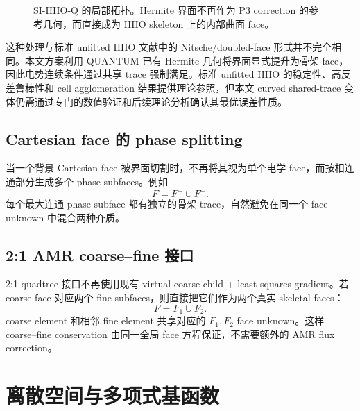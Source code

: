 \documentclass[UTF8,a4paper,11pt]{ctexart}
\begin{document}
\begin{figure}[htbp]
\centering
{}
\caption{SI-HHO-Q 的局部拓扑。Hermite 界面不再作为 P3 correction 的参考几何，而直接成为 HHO skeleton 上的内部曲面 face。}
\label{fig:cut_cell_topology}
\end{figure}

这种处理与标准 unfitted HHO 文献中的 Nitsche/doubled-face 形式并不完全相同。本文方案利用 QUANTUM 已有 Hermite 几何将界面显式提升为骨架 face，因此电势连续条件通过共享 trace 强制满足。标准 unfitted HHO 的稳定性、高反差鲁棒性和 cell agglomeration 结果提供理论参照\cite{BurmanErn2018,BurmanCicuttinDelayErn2021}，但本文 curved shared-trace 变体仍需通过专门的数值验证和后续理论分析确认其最优误差性质。

\subsection{Cartesian face 的 phase splitting}

当一个背景 Cartesian face 被界面切割时，不再将其视为单个电学 face，而按相连通部分生成多个 phase subfaces。例如
\[
F=F^-\cup F^+.
\]
每个最大连通 phase subface 都有独立的骨架 trace，自然避免在同一个 face unknown 中混合两种介质。

\subsection{2:1 AMR coarse--fine 接口}

2:1 quadtree 接口不再使用现有 virtual coarse child + least-squares gradient。若 coarse face 对应两个 fine subfaces，则直接把它们作为两个真实 skeletal faces：
\[
F=F_1\cup F_2.
\]
coarse element 和相邻 fine element 共享对应的 \(F_1,F_2\) face unknown。这样 coarse--fine conservation 由同一全局 face 方程保证，不需要额外的 AMR flux correction。

\section{离散空间与多项式基函数}
\end{document}
